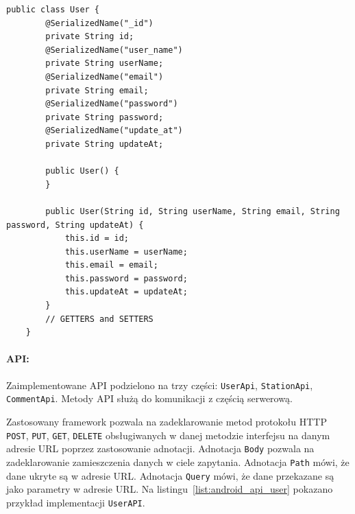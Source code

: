 
\begin{lstlisting}[label=list:user_class,caption=Plik \texttt{main/java/com/example/testapp/api/api/UserApi.java},basicstyle=\tiny\ttfamily]
    public class User {
        @SerializedName("_id")
        private String id;
        @SerializedName("user_name")
        private String userName;
        @SerializedName("email")
        private String email;
        @SerializedName("password")
        private String password;
        @SerializedName("update_at")
        private String updateAt;
    
        public User() {
        }
    
        public User(String id, String userName, String email, String password, String updateAt) {
            this.id = id;
            this.userName = userName;
            this.email = email;
            this.password = password;
            this.updateAt = updateAt;
        }
        // GETTERS and SETTERS
    }
\end{lstlisting}

\paragraph{API:} 
Zaimplementowane API podzielono na trzy części: \texttt{UserApi}, %
\texttt{StationApi}, %
\texttt{CommentApi}. %
Metody API służą do komunikacji z częścią serwerową.

Zastosowany framework pozwala na zadeklarowanie metod protokołu HTTP  \texttt{POST}, \texttt{PUT}, \texttt{GET}, \texttt{DELETE} obsługiwanych w danej metodzie interfejsu na danym adresie URL poprzez zastosowanie adnotacji. Adnotacja \texttt{Body} pozwala na zadeklarowanie zamieszczenia danych w ciele zapytania. Adnotacja \texttt{Path} mówi, że dane ukryte są w adresie URL. Adnotacja \texttt{Query} mówi, że dane przekazane są jako parametry w adresie URL. Na listingu~\ref{list:android_api_user} pokazano przykład implementacji \texttt{UserAPI}.

